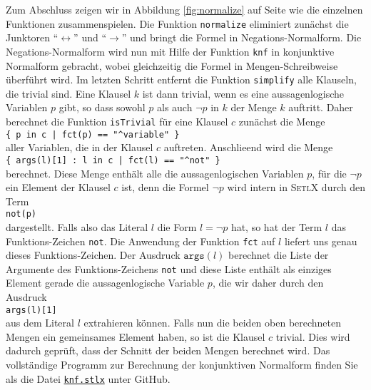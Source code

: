 Zum Abschluss zeigen wir in Abbildung \ref{fig:normalize} auf Seite \pageref{fig:normalize}
wie die einzelnen Funktionen zusammenspielen.  Die Funktion \texttt{normalize} eliminiert
zun\"{a}chst die Junktoren ``$\leftrightarrow$'' und ``$\rightarrow$'' und bringt die Formel
in Negations-Normalform.  Die Negations-Normalform wird nun mit Hilfe der Funktion
\texttt{knf} in konjunktive Normalform gebracht, wobei gleichzeitig die Formel in
Mengen-Schreibweise \"{u}berf\"{u}hrt wird.  Im letzten Schritt entfernt die Funktion
\texttt{simplify} alle Klauseln, die trivial sind.   Eine Klausel $k$ ist dann trivial,
wenn es eine aussagenlogische Variablen $p$ gibt, so dass sowohl $p$ als auch $\neg p$
in $k$ der Menge $k$ auftritt.  Daher berechnet die Funktion \texttt{isTrivial} f\"{u}r eine
Klausel $c$ zun\"{a}chst die Menge
\\[0.2cm]
\hspace*{1.3cm}
\verb'{ p in c | fct(p) == "^variable" }'
\\[0.2cm]
aller Variablen, die in der Klausel $c$ auftreten.  Anschlie\3end wird die Menge
\\[0.2cm]
\hspace*{1.3cm}
\verb'{ args(l)[1] : l in c | fct(l) == "^not" }'
\\[0.2cm]
berechnet.  Diese Menge enth\"{a}lt alle die aussagenlogischen Variablen $p$, f\"{u}r die $\neg p$
ein Element der Klausel $c$ ist, denn die Formel $\neg p$ wird intern in \textsc{SetlX}
durch den Term
\\[0.2cm]
\hspace*{1.3cm}
\texttt{not(p)}
\\[0.2cm]
dargestellt.  Falls also das Literal $l$ die Form $l = \neg p$ hat, so hat der Term $l$
das Funktions-Zeichen \texttt{not}.  Die Anwendung der Funktion
\texttt{fct} auf $l$ liefert uns genau dieses Funktions-Zeichen.  Der Ausdruck
$\texttt{args}(l)$ berechnet die Liste der Argumente des Funktions-Zeichens 
\texttt{not} und diese Liste enth\"{a}lt als einziges Element gerade die
aussagenlogische Variable $p$, die wir daher durch den Ausdruck
\\[0.2cm]
\hspace*{1.3cm}
\texttt{args(l)[1]}
\\[0.2cm]
aus dem Literal $l$ extrahieren k\"{o}nnen.  Falls nun die beiden oben berechneten Mengen ein
gemeinsames Element haben, so ist die Klausel $c$ trivial.  Dies wird dadurch gepr\"{u}ft,
dass der Schnitt der beiden Mengen berechnet wird.
Das vollst\"{a}ndige Programm zur Berechnung der konjunktiven Normalform finden Sie als die Datei
\href{https://github.com/karlstroetmann/Logik/blob/master/SetlX/knf.stlx}{\texttt{knf.stlx}}
unter GitHub.

